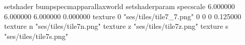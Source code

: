 setshader bumpspecmapparallaxworld
setshaderparam specscale 6.000000 6.000000 6.000000 0.000000
texture 0 "ses/tiles/tile7_7.png" 0 0 0 0.125000
texture n "ses/tiles/tile7n.png"
texture z "ses/tiles/tile7z.png"
texture s "ses/tiles/tile7s.png"

